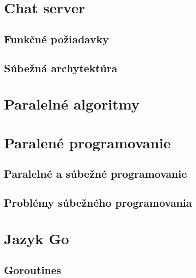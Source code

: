 \documentclass[
  biblatex,
  seconds=true,
  language=slovak,
  figures=false,
  glossaries,
  index
]{kidiplom}
\begin{document}
\section{Chat server}
\subsection{Funkčné požiadavky}
\subsection{Súbežná archytektúra}
\section{Paralelné algoritmy}
\section{Paralené programovanie}
\subsection{Paralelné a súbežné programovanie}
\subsection{Problémy súbežného programovania}
\section{Jazyk Go}
\subsection{Goroutines}











\end{document}
